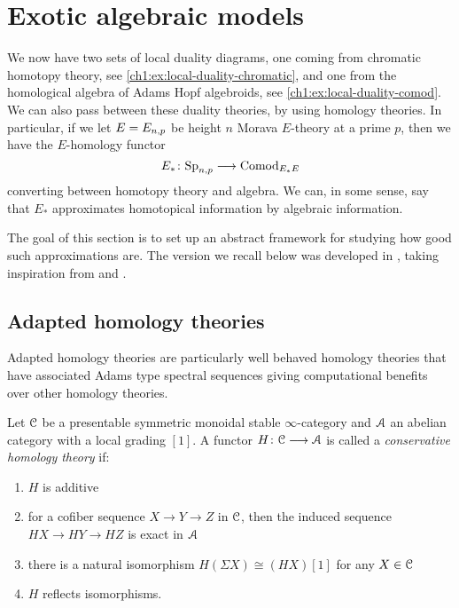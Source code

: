 
\section{Exotic algebraic models}
\label{ch1:sec:exotic-algebraic-models}

We now have two sets of local duality diagrams, one coming from chromatic homotopy theory, see \cref{ch1:ex:local-duality-chromatic}, and one from the homological algebra of Adams Hopf algebroids, see \cref{ch1:ex:local-duality-comod}. We can also pass between these duality theories, by using homology theories. In particular, if we let $E=E_{n,p}$ be height $n$ Morava $E$-theory at a prime $p$, then we have the $E$-homology functor 
\[E_*\colon \mathrm{Sp}_{n,p}\longrightarrow \mathrm{Comod}_{E_*E}\] 
converting between homotopy theory and algebra. We can, in some sense, say that $E_*$ approximates homotopical information by algebraic information. 

The goal of this section is to set up an abstract framework for studying how good such approximations are. The version we recall below was developed in \cite{patchkoria-pstragowski_2021}, taking inspiration from \cite{franke_96} and \cite{pstragowski_2022}. 


\subsection{Adapted homology theories}

Adapted homology theories are particularly well behaved homology theories that have associated Adams type spectral sequences giving computational benefits over other homology theories. 

\begin{definition}
    \label{ch1:def:homology-theory}
    Let $\EuScript{C}$ be a presentable symmetric monoidal stable $\infty$-category and $\EuScript{A}$ an abelian category with a local grading $[1]$. A functor $H\colon \EuScript{C}\longrightarrow \EuScript{A}$ is called a \emph{conservative homology theory} if:
    \begin{enumerate}
        \item $H$ is additive
        \item for a cofiber sequence $X\to Y\to Z$ in $\EuScript{C}$, then the induced sequence $HX\to HY\to HZ$ is exact in $\EuScript{A}$
        \item there is a natural isomorphism $H(\Sigma X)\cong (HX)[1]$ for any $X\in \EuScript{C}$
        \item $H$ reflects isomorphisms. 
    \end{enumerate}
\end{definition}

